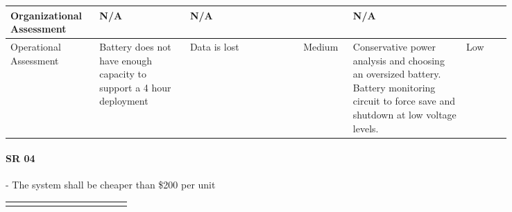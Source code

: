 \begin{landscape}
{\begin{longtable}{| p{0.12\linewidth} | p{0.16\linewidth} |  p{0.20\linewidth} | p{0.08\linewidth} | p{0.20\linewidth} | p{0.08\linewidth} |}
	\hline
	Organizational \newline Assessment & N/A & N/A & \cellcolor[gray]{0.8} & N/A & \cellcolor[gray]{0.8} \\
	\hline
	Operational \newline Assessment & Battery does not have enough capacity to support a 4 hour deployment & Data is lost & \cellcolor{yellow} Medium & Conservative power analysis and choosing an oversized battery. \newline Battery monitoring circuit to force save and shutdown at low voltage levels. & \cellcolor{green} Low
	\label{tab:sr03_feasibility}
\end{longtable}
}
\newpage



\paragraph*{SR 04} - The system shall be cheaper than \$200 per unit

{\fontsize{8pt}{8pt}\selectfont
\begin{longtable}{| p{0.12\linewidth} | p{0.16\linewidth} |  p{0.20\linewidth} | p{0.08\linewidth} | p{0.20\linewidth} | p{0.08\linewidth} |}
	\hline \endlastfoot


\end{longtable}}
\end{landscape}
